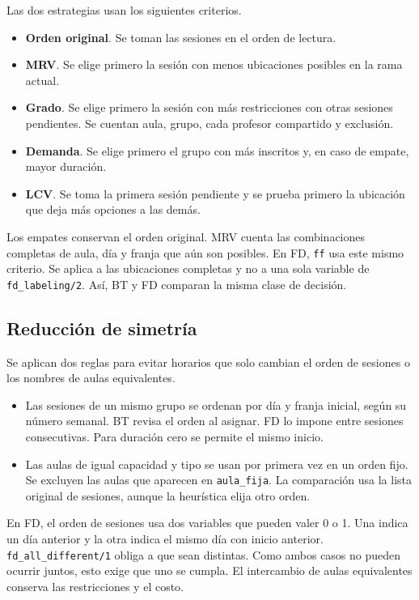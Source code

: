 \documentclass[11pt]{article}
\begin{document}
Las dos estrategias usan los siguientes criterios.
\begin{itemize}
    \item \textbf{Orden original}. Se toman las sesiones en el orden de lectura.
    \item \textbf{MRV}. Se elige primero la sesión con menos ubicaciones posibles en la rama actual.
    \item \textbf{Grado}. Se elige primero la sesión con más restricciones con otras sesiones pendientes. Se cuentan aula, grupo, cada profesor compartido y exclusión.
    \item \textbf{Demanda}. Se elige primero el grupo con más inscritos y, en caso de empate, mayor duración.
    \item \textbf{LCV}. Se toma la primera sesión pendiente y se prueba primero la ubicación que deja más opciones a las demás.
\end{itemize}
Los empates conservan el orden original. MRV cuenta las combinaciones completas de aula, día y franja que aún son posibles. En FD, \texttt{ff} usa este mismo criterio. Se aplica a las ubicaciones completas y no a una sola variable de \texttt{fd\_labeling/2}. Así, BT y FD comparan la misma clase de decisión.

\subsection{Reducción de simetría}

Se aplican dos reglas para evitar horarios que solo cambian el orden de sesiones o los nombres de aulas equivalentes.
\begin{itemize}
    \item Las sesiones de un mismo grupo se ordenan por día y franja inicial, según su número semanal. BT revisa el orden al asignar. FD lo impone entre sesiones consecutivas. Para duración cero se permite el mismo inicio.
    \item Las aulas de igual capacidad y tipo se usan por primera vez en un orden fijo. Se excluyen las aulas que aparecen en \texttt{aula\_fija}. La comparación usa la lista original de sesiones, aunque la heurística elija otro orden.
\end{itemize}
En FD, el orden de sesiones usa dos variables que pueden valer 0 o 1. Una indica un día anterior y la otra indica el mismo día con inicio anterior. \texttt{fd\_all\_different/1} obliga a que sean distintas. Como ambos casos no pueden ocurrir juntos, esto exige que uno se cumpla. El intercambio de aulas equivalentes conserva las restricciones y el costo.
\end{document}
